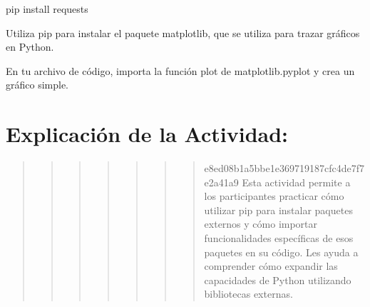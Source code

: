 \documentclass[
  a4paper,
  onepage,
  openany]{scrreprt}
\newenvironment{Shaded}{\begin{snugshade}}{\end{snugshade}}
\newcommand{\ExtensionTok}[1]{\textcolor[rgb]{0.00,0.23,0.31}{#1}}
\newcommand{\NormalTok}[1]{\textcolor[rgb]{0.00,0.23,0.31}{#1}}
\begin{document}
\begin{Shaded}
\begin{Highlighting}[]
\ExtensionTok{pip}\NormalTok{ install requests}
\end{Highlighting}
\end{Shaded}

\begin{tcolorbox}[enhanced jigsaw, breakable, opacityback=0, toptitle=1mm, coltitle=black, toprule=.15mm, rightrule=.15mm, colframe=quarto-callout-important-color-frame, opacitybacktitle=0.6, arc=.35mm, title=\textcolor{quarto-callout-important-color}{\faExclamation}\hspace{0.5em}{Actividad Práctica:}, titlerule=0mm, colbacktitle=quarto-callout-important-color!10!white, bottomtitle=1mm, bottomrule=.15mm, colback=white, left=2mm, leftrule=.75mm]

Utiliza pip para instalar el paquete matplotlib, que se utiliza para
trazar gráficos en Python.

En tu archivo de código, importa la función plot de matplotlib.pyplot y
crea un gráfico simple.

\end{tcolorbox}

\hypertarget{explicaciuxf3n-de-la-actividad-63}{%
\section{Explicación de la
Actividad:}\label{explicaciuxf3n-de-la-actividad-63}}

\begin{quote}
\begin{quote}
\begin{quote}
\begin{quote}
\begin{quote}
\begin{quote}
\begin{quote}
e8ed08b1a5bbe1e369719187cfc4de7f7e2a41a9 Esta actividad permite a los
participantes practicar cómo utilizar pip para instalar paquetes
externos y cómo importar funcionalidades específicas de esos paquetes en
su código. Les ayuda a comprender cómo expandir las capacidades de
Python utilizando bibliotecas externas.
\end{quote}
\end{quote}
\end{quote}
\end{quote}
\end{quote}
\end{quote}
\end{quote}
\end{document}
